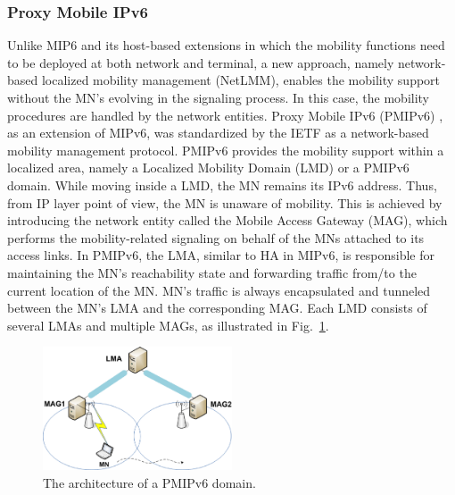 \subsubsection{Proxy Mobile IPv6} \label{section:PMIPv6}
Unlike MIP6 and its host-based extensions in which the mobility functions need to be deployed at both network and terminal, a new approach, namely network-based localized mobility management (NetLMM), enables the mobility support without the MN's evolving in the signaling process. In this case, the mobility procedures are handled by the network entities. Proxy Mobile IPv6 (PMIPv6) \cite{PMIPv6}, as an extension of MIPv6,  was standardized by the IETF as a network-based mobility management protocol. PMIPv6 provides the mobility support within a localized area, namely a Localized Mobility Domain (LMD) or a PMIPv6 domain. While moving inside a LMD, the MN remains its IPv6 address. Thus, from IP layer point of view, the MN is unaware of mobility. This is achieved by introducing the network entity called the Mobile Access Gateway (MAG), which performs the mobility-related signaling on behalf of the MNs attached to its access links. In PMIPv6, the LMA, similar to HA in MIPv6, is responsible for maintaining the MN's reachability state and forwarding traffic from/to the current location of the MN. MN's traffic is always encapsulated and tunneled between the MN's LMA and the corresponding MAG. Each LMD consists of several LMAs and multiple MAGs, as illustrated in Fig.~\ref{fig:c3_pmip_domain}.
\begin{figure}[h!] 
 \begin{center} 
 \includegraphics[width=0.50\textwidth]{./Part1/Chapter2/figures/c3_pmip_domain.eps} 
    \caption[The architecture of a PMIPv6 domain]{The architecture of a PMIPv6 domain.}
     \label{fig:c3_pmip_domain}
  \end{center} 
\end{figure}

